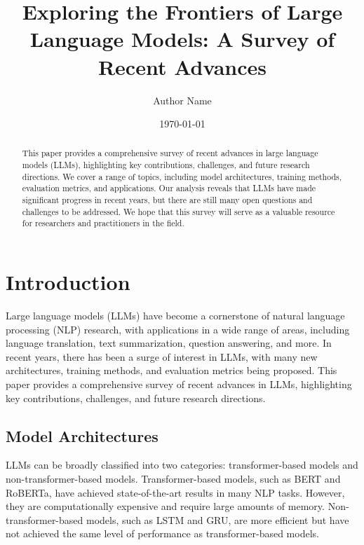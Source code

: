 \documentclass{article}
\begin{document}
\title{Exploring the Frontiers of Large Language Models: A Survey of Recent Advances}

\author{Author Name}
\date{\today}

\maketitle

\begin{abstract}
This paper provides a comprehensive survey of recent advances in large language models (LLMs), highlighting key contributions, challenges, and future research directions. We cover a range of topics, including model architectures, training methods, evaluation metrics, and applications. Our analysis reveals that LLMs have made significant progress in recent years, but there are still many open questions and challenges to be addressed. We hope that this survey will serve as a valuable resource for researchers and practitioners in the field.
\end{abstract}

\section{Introduction}

Large language models (LLMs) have become a cornerstone of natural language processing (NLP) research, with applications in a wide range of areas, including language translation, text summarization, question answering, and more. In recent years, there has been a surge of interest in LLMs, with many new architectures, training methods, and evaluation metrics being proposed. This paper provides a comprehensive survey of recent advances in LLMs, highlighting key contributions, challenges, and future research directions.

\subsection{Model Architectures}

LLMs can be broadly classified into two categories: transformer-based models and non-transformer-based models. Transformer-based models, such as BERT and RoBERTa, have achieved state-of-the-art results in many NLP tasks. However, they are computationally expensive and require large amounts of memory. Non-transformer-based models, such as LSTM and GRU, are more efficient but have not achieved the same level of performance as transformer-based models.
\end{document}
